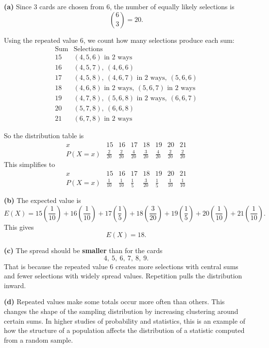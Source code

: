 \begin{solution}
\textbf{(a)} Since $3$ cards are chosen from $6$, the number of equally likely selections is
\[
\binom63=20.
\]

Using the repeated value $6$, we count how many selections produce each sum:
\[
\begin{array}{c|c}
\text{Sum} & \text{Selections} \\
\hline
15 & (4,5,6)\text{ in }2\text{ ways} \\
16 & (4,5,7),\ (4,6,6) \\
17 & (4,5,8),\ (4,6,7)\text{ in }2\text{ ways},\ (5,6,6) \\
18 & (4,6,8)\text{ in }2\text{ ways},\ (5,6,7)\text{ in }2\text{ ways} \\
19 & (4,7,8),\ (5,6,8)\text{ in }2\text{ ways},\ (6,6,7) \\
20 & (5,7,8),\ (6,6,8) \\
21 & (6,7,8)\text{ in }2\text{ ways}
\end{array}
\]

So the distribution table is
\[
\begin{array}{c|ccccccc}
x & 15 & 16 & 17 & 18 & 19 & 20 & 21 \\
\hline
P(X=x) & \frac{2}{20} & \frac{2}{20} & \frac{4}{20} & \frac{3}{20} & \frac{4}{20} & \frac{2}{20} & \frac{2}{20}
\end{array}
\]
This simplifies to
\[
\begin{array}{c|ccccccc}
x & 15 & 16 & 17 & 18 & 19 & 20 & 21 \\
\hline
P(X=x) & \frac{1}{10} & \frac{1}{10} & \frac{1}{5} & \frac{3}{20} & \frac{1}{5} & \frac{1}{10} & \frac{1}{10}
\end{array}
\]

\textbf{(b)} The expected value is
\[
E(X)=15\left(\frac{1}{10}\right)+16\left(\frac{1}{10}\right)+17\left(\frac{1}{5}\right)+18\left(\frac{3}{20}\right)+19\left(\frac{1}{5}\right)+20\left(\frac{1}{10}\right)+21\left(\frac{1}{10}\right).
\]
This gives
\[
E(X)=18.
\]

\textbf{(c)} The spread should be \textbf{smaller} than for the cards
\[
4,\ 5,\ 6,\ 7,\ 8,\ 9.
\]
That is because the repeated value $6$ creates more selections with central sums and fewer selections with widely spread values. Repetition pulls the distribution inward.

\textbf{(d)} Repeated values make some totals occur more often than others. This changes the shape of the sampling distribution by increasing clustering around certain sums. In higher studies of probability and statistics, this is an example of how the structure of a population affects the distribution of a statistic computed from a random sample.
\end{solution}

